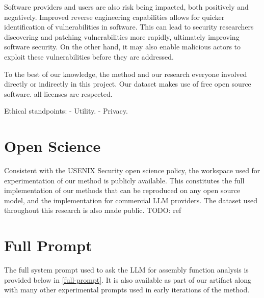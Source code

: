 Software providers and users are also risk being impacted, both positively and negatively. Improved reverse engineering
capabilities allows for quicker identification of vulnerabilities in software. This can lead to security researchers
discovering and patching vulnerabilities more rapidly, ultimately improving software security. On the other hand, it may
also enable malicious actors to exploit these vulnerabilities before they are addressed. 

To the best of our knowledge, the method and our research everyone involved directly or indirectly in this project.
Our dataset makes use of free open source software. all licenses are respected.

Ethical standpoints:
- Utility.
- Privacy.

\section*{Open Science}

Consistent with the USENIX Security open science policy, the workspace used for experimentation
of our method is publicly available. This constitutes the full implementation of our methods that can be reproduced on
any open source model, and the implementation for commercial LLM providers. The dataset used throughout this research
is also made public. TODO: ref




\appendix

\section{Full Prompt}

The full system prompt used to ask the LLM for assembly function analysis is provided below in \ref{full-prompt}. It is also available as
part of our artifact along with many other experimental prompts used in early iterations of the method.

